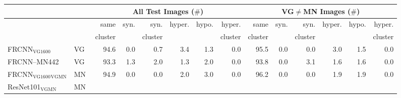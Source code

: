 \begin{table}[t]
	\centering
	\small
	\begin{tabular}{llr@{~}|r@{~}r@{~}r@{~}r@{~}r@{~}||r@{~}|r@{~}r@{~}r@{~}r@{~}r@{~}}
		\toprule
		& & \multicolumn{6}{c}{All Test Images ($\#$)} 
		& \multicolumn{6}{c}{VG$\neq$MN Images ($\#$)}\\
		\toprule
		& &  same &  syn. &  syn. &  hyper. &  hypo. &  hyper. &  same &  syn. &  syn. &  hyper. &  hypo. &  hyper. \\
		& 	&  cluster &  & cluster & & & cluster 
			& cluster  &  & cluster & & & cluster \\
		\midrule
		FRCNN$_{\text{VG1600}}$ & VG     %
		 &                  94.6 &              0.0 &                 0.7 &               3.4 &              1.3 &                  0.0 &                  95.5 &              0.0 &                 0.0 &               3.0 &              1.5 &                  0.0 \\
		FRCNN--MN442 & VG %
		 &                  93.3 &              1.3 &                 2.0 &               1.3 &              2.0 &                  0.0 &                  93.8 &              0.0 &                 3.1 &               1.6 &              1.6 &                  0.0 \\
		\midrule \midrule
		FRCNN$_{\text{VG1600}}$$_{\text{VGMN}}$ & MN %
		 &                  94.9 &              0.0 &                 0.0 &               2.0 &              3.0 &                  0.0 &                  96.2 &              0.0 &                 0.0 &               1.9 &              1.9 &                  0.0 \\
		\midrule
		ResNet101$_{\text{VGMN}}$ & MN %
$$
\end{tabular}
\end{table}
